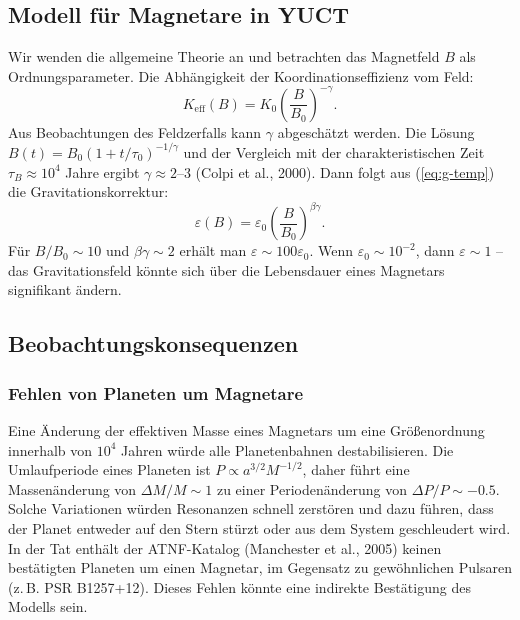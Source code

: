 \documentclass[12pt]{article}
\theoremstyle{remark}
\newcommand{\Keff}{K_{\mathrm{eff}}}
\newcommand{\eps}{\varepsilon}
\begin{document}
	\subsection{Modell für Magnetare in YUCT}
	\label{subsec:magnetars-model}
	
	Wir wenden die allgemeine Theorie an und betrachten das Magnetfeld $B$ als Ordnungsparameter. Die Abhängigkeit der Koordinationseffizienz vom Feld:
	\begin{equation}
		\Keff(B) = K_0 \left( \frac{B}{B_0} \right)^{-\gamma}.
		\label{eq:keff-b}
	\end{equation}
	Aus Beobachtungen des Feldzerfalls kann $\gamma$ abgeschätzt werden. Die Lösung $B(t) = B_0 (1 + t/\tau_0)^{-1/\gamma}$ und der Vergleich mit der charakteristischen Zeit $\tau_B \approx 10^4$ Jahre ergibt $\gamma \approx 2$–$3$ (Colpi et al., 2000). Dann folgt aus (\ref{eq:g-temp}) die Gravitationskorrektur:
	\begin{equation}
		\eps(B) = \eps_0 \left( \frac{B}{B_0} \right)^{\beta\gamma}.
		\label{eq:eps-b}
	\end{equation}
	Für $B/B_0 \sim 10$ und $\beta\gamma \sim 2$ erhält man $\eps \sim 100 \eps_0$. Wenn $\eps_0 \sim 10^{-2}$, dann $\eps \sim 1$ – das Gravitationsfeld könnte sich über die Lebensdauer eines Magnetars signifikant ändern.
	
	\subsection{Beobachtungskonsequenzen}
	\label{subsec:magnetars-consequences}
	
	\subsubsection{Fehlen von Planeten um Magnetare}
	\label{subsubsec:magnetars-planets}
	
	Eine Änderung der effektiven Masse eines Magnetars um eine Größenordnung innerhalb von $10^4$ Jahren würde alle Planetenbahnen destabilisieren. Die Umlaufperiode eines Planeten ist $P \propto a^{3/2} M^{-1/2}$, daher führt eine Massenänderung von $\Delta M/M \sim 1$ zu einer Periodenänderung von $\Delta P/P \sim -0.5$. Solche Variationen würden Resonanzen schnell zerstören und dazu führen, dass der Planet entweder auf den Stern stürzt oder aus dem System geschleudert wird. In der Tat enthält der ATNF-Katalog (Manchester et al., 2005) keinen bestätigten Planeten um einen Magnetar, im Gegensatz zu gewöhnlichen Pulsaren (z. B. PSR B1257+12). Dieses Fehlen könnte eine indirekte Bestätigung des Modells sein.
	
\end{document}
